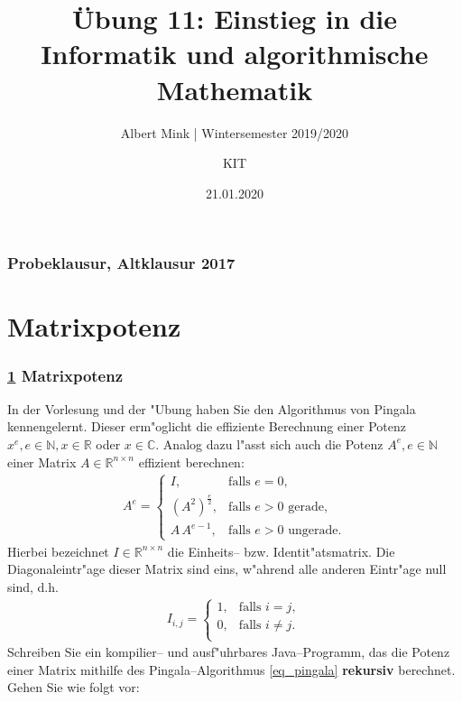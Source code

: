 \documentclass[c,18pt]{beamer}
\date{21.01.2020}
\title[Übung 11: Einstieg in die Informatik und algorithmische Mathematik]
  {Übung 11: Einstieg in die Informatik und algorithmische Mathematik}
\subtitle{Albert Mink | Wintersemester 2019/2020}
\author[Albert Mink, ]{KIT}
\institute[Institut für Angewandte und Numerische Mathematik (IANM)]{Institut für Angewandte und Numerische Mathematik}
\begin{document}
\begin{frame}
  \maketitle
\end{frame}

\begin{frame}
  \frametitle{Probeklausur, Altklausur 2017}%
\tableofcontents
\end{frame}

\def\stitle{Matrixpotenz}
\section{\stitle}\label{S:matrix}
\begin{frame}[t]%
  \frametitle{\ref{S:matrix} \stitle}
In der Vorlesung und der "Ubung haben Sie den Algorithmus von Pingala kennengelernt. Dieser erm"oglicht die
effiziente Berechnung einer Potenz $x^e, e\in\mathbb N, x\in\mathbb R$ oder $x\in\mathbb C$. Analog dazu
l"asst sich auch die Potenz $A^e, e\in\mathbb N$ einer Matrix $A\in\mathbb R^{n \times n}$ effizient
berechnen:
\begin{align}
 \label{eq_pingala}
 A^e =
  \begin{cases}
   I, & \text{falls } e=0,\\
   (A^2)^{\frac{e}{2}}, & \text{falls $e>0$ gerade},\\
   A\,A^{e-1}, & \text{falls $e>0$ ungerade}.
  \end{cases}
\end{align}
Hierbei bezeichnet $I\in\mathbb R^{n \times n}$ die Einheits-- bzw. Identit"atsmatrix. Die Diagonaleintr"age dieser
Matrix sind eins, w"ahrend alle anderen Eintr"age null sind, d.h.
\begin{align*}
 I_{i,j} =
 \begin{cases}
   1, &\text{falls } i=j,\\
   0, &\text{falls } i\neq j.\\
 \end{cases}
\end{align*}
Schreiben Sie ein kompilier-- und ausf"uhrbares Java--Programm, das die Potenz einer Matrix mithilfe des
Pingala--Algorithmus \eqref{eq_pingala} \textbf{rekursiv} berechnet. Gehen Sie wie folgt vor:\\[1em]

\end{frame}
\end{document}
